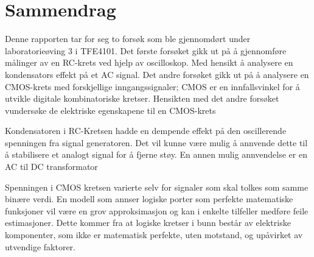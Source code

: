 \section{Sammendrag}

    Denne rapporten tar for seg to forsøk  som ble gjennomdørt under laboratorieøving 3 i TFE4101. Det første forsøket gikk ut på å gjennomføre målinger av en RC-krets ved hjelp av oscilloskop.
    Med hensikt å analysere en kondensators effekt på et AC signal.
    Det andre forsøket gikk ut på å analysere en CMOS-krets med forskjellige inngangssignaler;
    CMOS er en innfallsvinkel for å utvikle digitale kombinatoriske kretser. Hensikten med det andre forsøket vundersøke de elektriske egenskapene til en CMOS-krets

    Kondensatoren i RC-Kretsen hadde en dempende effekt på den oscillerende spenningen fra signal generatoren. Det vil kunne være mulig å annvende dette til å stabilisere et analogt signal for å fjerne støy. En annen mulig annvendelse er en AC til DC transformator

    Spenningen i CMOS kretsen varierte selv for signaler som skal tolkes som samme binære verdi. En modell som annser logiske porter som perfekte matematiske funksjoner vil være en grov approksimasjon og kan i enkelte tilfeller medføre feile estimasjoner. Dette kommer fra at logiske kretser i bunn består av elektriske komponenter, som ikke er matematisk perfekte, uten motstand, og upåvirket av utvendige faktorer. 